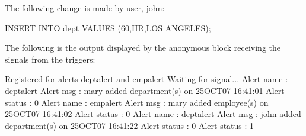 \documentclass[letterpaper,10pt,english,openany,oneside]{sphinxmanual}
\begin{document}
The following change is made by user, john:

%
\begin{sphinxVerbatim}[commandchars=\\\{\}]
INSERT INTO dept VALUES (60,\PYGZsq{}HR\PYGZsq{},\PYGZsq{}LOS ANGELES\PYGZsq{});
\end{sphinxVerbatim}

The following is the output displayed by the anonymous block receiving the signals from the triggers:

%
\begin{sphinxVerbatim}[commandchars=\\\{\}]
Registered for alerts dept\PYGZus{}alert and emp\PYGZus{}alert
Waiting for signal...
Alert name   : dept\PYGZus{}alert
Alert msg    : mary added department(s) on 25\PYGZhy{}OCT\PYGZhy{}07 16:41:01
Alert status : 0
 \PYGZhy{}\PYGZhy{}\PYGZhy{}\PYGZhy{}\PYGZhy{}\PYGZhy{}\PYGZhy{}\PYGZhy{}\PYGZhy{}\PYGZhy{}\PYGZhy{}\PYGZhy{}\PYGZhy{}\PYGZhy{}\PYGZhy{}\PYGZhy{}\PYGZhy{}\PYGZhy{}\PYGZhy{}\PYGZhy{}\PYGZhy{}\PYGZhy{}\PYGZhy{}\PYGZhy{}\PYGZhy{}\PYGZhy{}\PYGZhy{}\PYGZhy{}\PYGZhy{}\PYGZhy{}\PYGZhy{}\PYGZhy{}\PYGZhy{}\PYGZhy{}\PYGZhy{}\PYGZhy{}\PYGZhy{}\PYGZhy{}\PYGZhy{}\PYGZhy{}\PYGZhy{}\PYGZhy{}\PYGZhy{}\PYGZhy{}\PYGZhy{}\PYGZhy{}\PYGZhy{}\PYGZhy{}\PYGZhy{}\PYGZhy{}\PYGZhy{}\PYGZhy{}\PYGZhy{}\PYGZhy{}\PYGZhy{}\PYGZhy{}\PYGZhy{}\PYGZhy{}\PYGZhy{}\PYGZhy{}\PYGZhy{}
Alert name   : emp\PYGZus{}alert
Alert msg    : mary added employee(s) on 25\PYGZhy{}OCT\PYGZhy{}07 16:41:02
Alert status : 0
 \PYGZhy{}\PYGZhy{}\PYGZhy{}\PYGZhy{}\PYGZhy{}\PYGZhy{}\PYGZhy{}\PYGZhy{}\PYGZhy{}\PYGZhy{}\PYGZhy{}\PYGZhy{}\PYGZhy{}\PYGZhy{}\PYGZhy{}\PYGZhy{}\PYGZhy{}\PYGZhy{}\PYGZhy{}\PYGZhy{}\PYGZhy{}\PYGZhy{}\PYGZhy{}\PYGZhy{}\PYGZhy{}\PYGZhy{}\PYGZhy{}\PYGZhy{}\PYGZhy{}\PYGZhy{}\PYGZhy{}\PYGZhy{}\PYGZhy{}\PYGZhy{}\PYGZhy{}\PYGZhy{}\PYGZhy{}\PYGZhy{}\PYGZhy{}\PYGZhy{}\PYGZhy{}\PYGZhy{}\PYGZhy{}\PYGZhy{}\PYGZhy{}\PYGZhy{}\PYGZhy{}\PYGZhy{}\PYGZhy{}\PYGZhy{}\PYGZhy{}\PYGZhy{}\PYGZhy{}\PYGZhy{}\PYGZhy{}\PYGZhy{}\PYGZhy{}\PYGZhy{}\PYGZhy{}\PYGZhy{}\PYGZhy{}
Alert name   : dept\PYGZus{}alert
Alert msg    : john added department(s) on 25\PYGZhy{}OCT\PYGZhy{}07 16:41:22
Alert status : 0
 \PYGZhy{}\PYGZhy{}\PYGZhy{}\PYGZhy{}\PYGZhy{}\PYGZhy{}\PYGZhy{}\PYGZhy{}\PYGZhy{}\PYGZhy{}\PYGZhy{}\PYGZhy{}\PYGZhy{}\PYGZhy{}\PYGZhy{}\PYGZhy{}\PYGZhy{}\PYGZhy{}\PYGZhy{}\PYGZhy{}\PYGZhy{}\PYGZhy{}\PYGZhy{}\PYGZhy{}\PYGZhy{}\PYGZhy{}\PYGZhy{}\PYGZhy{}\PYGZhy{}\PYGZhy{}\PYGZhy{}\PYGZhy{}\PYGZhy{}\PYGZhy{}\PYGZhy{}\PYGZhy{}\PYGZhy{}\PYGZhy{}\PYGZhy{}\PYGZhy{}\PYGZhy{}\PYGZhy{}\PYGZhy{}\PYGZhy{}\PYGZhy{}\PYGZhy{}\PYGZhy{}\PYGZhy{}\PYGZhy{}\PYGZhy{}\PYGZhy{}\PYGZhy{}\PYGZhy{}\PYGZhy{}\PYGZhy{}\PYGZhy{}\PYGZhy{}\PYGZhy{}\PYGZhy{}\PYGZhy{}\PYGZhy{}
Alert status : 1
\end{sphinxVerbatim}
\end{document}
